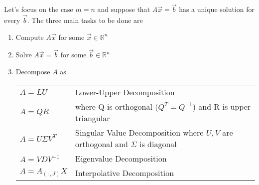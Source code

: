 \begin{center}
	
\end{center}

Let's focus on the case $m=n$ and suppose that
$A\Vec{x} = \Vec{b}$ has a unique solution for every $\Vec{b}$. 
The three main tasks to be done are 
%
\begin{enumerate}[1)]
    \item Compute $A\Vec{x}$ for some $\Vec{x}\in\mathbb{R}^n$
    \item Solve $A\Vec{x}=\Vec{b}$ for some $\Vec{b}\in\mathbb{R}^n$
    \item Decompose $A$ as 
    
	    \begin{tabular}{lp{6cm}}
         $A=LU$ & Lower-Upper Decomposition  \\
         $A=QR$ & where Q is orthogonal ($Q^T=Q^{-1}$) and R is upper triangular\\
         $A=U\Sigma V^T$ & Singular Value Decomposition 
	 			where $U, V$ are orthogonal and $\Sigma$ is diagonal\\
         $A=VDV^{-1}$ & Eigenvalue Decomposition\\
         $A=A_{(:, J)}X$ & Interpolative Decomposition
    \end{tabular}
\end{enumerate}
